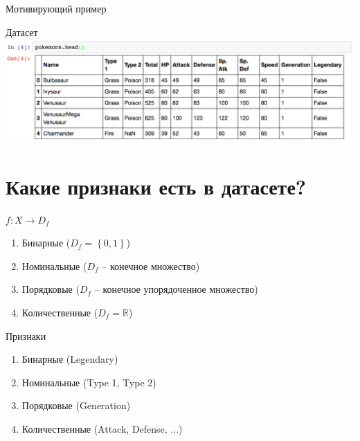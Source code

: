 \documentclass[10pt]{beamer}
\begin{document}
{\begin{frame}{Мотивирующий пример}
\begin{figure}
	    \qquad
	    \qquad
	\end{figure}
\end{frame}
}

\begin{frame}{Датасет}
    \centering
	\includegraphics[width=\textwidth]{images/pokemons}
\end{frame}

\section{Какие признаки есть в датасете?}

\begin{frame}
	${f: X \rightarrow D_f}$
	\begin{enumerate} [-]
	  \item Бинарные (${D_f = \left\{ 0, 1 \right\} }$)
	  \item Номинальные (${D_f}$ -- конечное множество)
	  \item Порядковые (${D_f}$ -- конечное упорядоченное множество)
	  \item Количественные (${D_f = \mathbb{R} }$)
	\end{enumerate}
\end{frame}

\begin{frame}{Признаки}
	\begin{enumerate} [-]	
		\item Бинарные (Legendary)
		\item Номинальные (Type 1, Type 2)
		\item Порядковые (Generation)
		\item Количественные (Attack, Defense, ...)
	\end{enumerate}
\end{frame}
\end{document}
